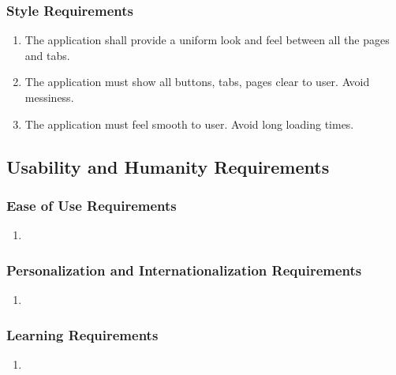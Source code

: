 \documentclass[english]{article}
\begin{document}
\subsubsection{Style Requirements}
\label{ssub:style_requirements}
\begin{enumerate}[{SR}1. ]
	\item The application shall provide a uniform look and feel between all the pages and tabs.
	\item The application must show all buttons, tabs, pages clear to user. Avoid messiness.
	\item The application must feel smooth to user. Avoid long loading times. 
\end{enumerate}


\subsection{Usability and Humanity Requirements}
\label{sub:usability_and_humanity_requirements}

\subsubsection{Ease of Use Requirements}
\label{ssub:ease_of_use_requirements}
\begin{enumerate}[{EUR}1. ]
	\item 
\end{enumerate}

\subsubsection{Personalization and Internationalization Requirements}
\label{ssub:personalization_and_internationalization_requirements}
\begin{enumerate}[{PIR}1. ]
	\item 
\end{enumerate}

\subsubsection{Learning Requirements}
\label{ssub:learning_requirements}
\begin{enumerate}[{LR}1. ]
	\item 
\end{enumerate}
\end{document}

